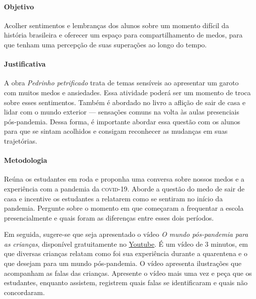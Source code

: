 \documentclass[11pt]{extarticle}
\begin{document}
\paragraph{Objetivo} Acolher sentimentos e lembranças dos alunos sobre um momento difícil da história brasileira e oferecer um espaço para compartilhamento de medos, para que tenham uma percepção de suas superações ao longo do tempo.

\paragraph{Justificativa} A obra \textit{Pedrinho petrificado} trata de temas sensíveis ao apresentar um garoto com muitos medos e ansiedades. Essa atividade poderá ser um momento de troca sobre esses sentimentos. Também é abordado no livro a aflição de sair de casa e lidar com o mundo exterior --- sensações comuns na volta às aulas presenciais pós-pandemia. Dessa forma, é importante abordar essa questão com os alunos para que se sintam acolhidos e consigam reconhecer as mudanças em suas trajetórias.

\paragraph{Metodologia} Reúna os estudantes em roda e proponha uma conversa sobre nossos medos e a experiência com a pandemia da \textsc{covid}-19. Aborde a questão do medo de sair de casa e incentive os estudantes a relatarem como se sentiram no início da pandemia. Pergunte sobre o momento em que começaram a frequentar a escola presencialmente e quais foram as diferenças entre esses dois períodos.


Em seguida, sugere-se que seja apresentado o vídeo \textit{O mundo pós-pandemia para as crianças}, disponível gratuitamente no \href{https://youtu.be/clP9tvFbqyw}{Youtube}. É um vídeo de 3 minutos, em que diversas crianças relatam como foi sua experiência durante a quarentena e o que desejam para um mundo pós-pandemia. O vídeo apresenta ilustrações que acompanham as falas das crianças. Apresente o vídeo mais uma vez e peça que os estudantes, enquanto assistem, registrem quais falas se identificaram e quais não concordaram. 

\end{document}
